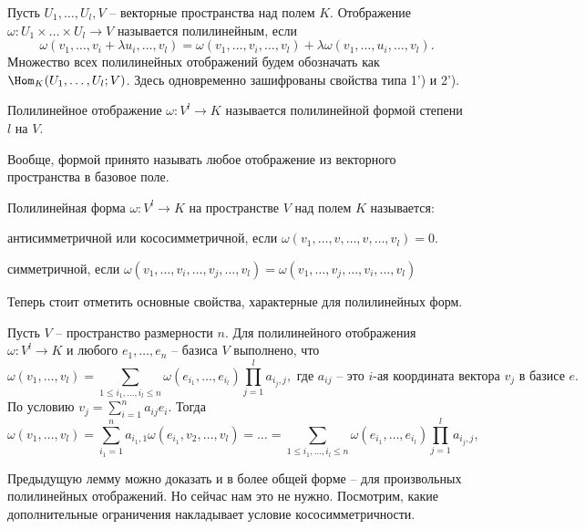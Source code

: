  Пусть $U_1,\dots,U_l, V$ -- векторные пространства над полем $K$. Отображение $\omega \colon  U_1\times \dots \times U_l\to V $ называется полилинейным, если
$$\omega(v_1,\dots,v_i+\lambda u_i,\dots, v_l)= \omega(v_1,\dots,v_i,\dots, v_l)+\lambda\omega(v_1,\dots,u_i,\dots, v_l).$$
Множество всех полилинейных отображений будем обозначать как $\Hom_K(U_1,\dots,U_l;V)$. Здесь одновременно зашифрованы свойства типа 1')  и  2').
\edfn


\dfn[Форма]
Полилинейное отображение $\omega \colon  V^l\to K $ называется полилинейной формой степени $l$ на $V$.
\edfn

\rm Вообще, формой принято называть любое отображение из векторного пространства в базовое поле.
\erm


\dfn
Полилинейная форма  $\omega \colon V^l\to K$ на пространстве $V$ над полем $K$ называется:
\enm 
\item антисимметричной или кососимметричной, если $\omega(v_1,\dots,v,\dots,v,\dots, v_l)=0$.
\item симметричной, если $\omega(v_1,\dots,v_i,\dots,v_j,\dots, v_l)=\omega(v_1,\dots,v_j,\dots,v_i,\dots, v_l)$
\eenm
\edfn



Теперь стоит  отметить основные свойства, характерные для полилинейных форм. 

\lm Пусть $V$ -- пространство размерности $n$. Для  полилинейного отображения $\omega \colon V^l \to K $ и любого $e_1,\dots,e_n$ -- базиса $V$  выполнено, что
$$\omega(v_1,\dots,v_l)=\sum_{1\leq i_1,\dots,i_l\leq n}\omega(e_{i_1},\dots,e_{i_l})\prod_{j=1}^l a_{i_j,j}, \text{ где $a_{ij}$ -- это $i$-ая координата вектора $v_j$ в базисе $e$.}$$ 
\elm
\proof По условию $v_j=\sum_{i=1}^n a_{ij}e_i$. Тогда $$\omega(v_1,\dots,v_l)=\sum_{i_1=1}^n a_{i_1,1}\omega(e_{i_1},v_2,\dots,v_l)= \dots = \sum_{1\leq i_1,\dots,i_l\leq n}\omega(e_{i_1},\dots,e_{i_l})\prod_{j=1}^l a_{i_j,j},$$
\endproof

Предыдущую лемму можно доказать и в более общей форме -- для произвольных полилинейных отображений. Но сейчас нам это не нужно. Посмотрим, какие дополнительные ограничения накладывает условие кососимметричности. 


